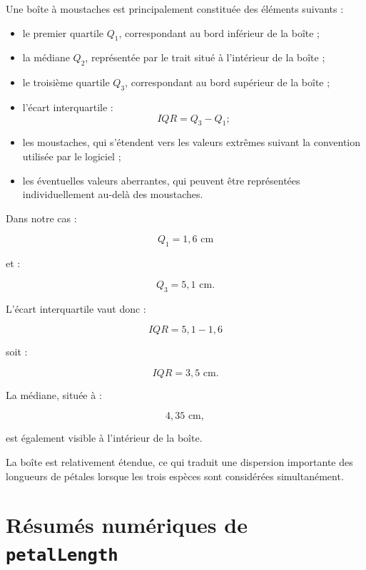 \documentclass[12pt,a4paper]{article}
\begin{document}
Une boîte à moustaches est principalement constituée des éléments
suivants :

\begin{itemize}

    \item le premier quartile \(Q_1\), correspondant au bord inférieur
    de la boîte ;

    \item la médiane \(Q_2\), représentée par le trait situé à
    l'intérieur de la boîte ;

    \item le troisième quartile \(Q_3\), correspondant au bord
    supérieur de la boîte ;

    \item l'écart interquartile :
    \[
    IQR = Q_3-Q_1 ;
    \]

    \item les moustaches, qui s'étendent vers les valeurs extrêmes
    suivant la convention utilisée par le logiciel ;

    \item les éventuelles valeurs aberrantes, qui peuvent être
    représentées individuellement au-delà des moustaches.

\end{itemize}

Dans notre cas :

\[
Q_1 = 1,6\text{ cm}
\]

et :

\[
Q_3 = 5,1\text{ cm}.
\]

L'écart interquartile vaut donc :

\[
IQR = 5,1-1,6
\]

soit :

\[
\boxed{IQR=3,5\text{ cm}}.
\]

La médiane, située à :

\[
\boxed{4,35\text{ cm}},
\]

est également visible à l'intérieur de la boîte.

La boîte est relativement étendue, ce qui traduit une dispersion
importante des longueurs de pétales lorsque les trois espèces sont
considérées simultanément.


\section{Résumés numériques de \texttt{petalLength}}
\end{document}
